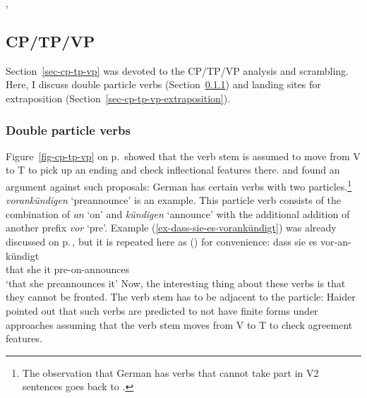 \citet*{GKPS85a}, \citet{Sag2020a}

\fi

\subsection{CP/TP/VP}
\label{sec-cp-tp-vp-and-verb-last-non-movement}

Section~\ref{sec-cp-tp-vp} was devoted to the CP/TP/VP analysis and
scrambling. Here, I discuss double particle verbs (Section~\ref{sec-cp-tp-vp-double-particles}) and landing sites for extraposition (Section~\ref{sec-cp-tp-vp-extraposition}).

\subsubsection{Double particle verbs}
\label{sec-cp-tp-vp-double-particles}


Figure~\ref{fig-cp-tp-vp} on p.\,\pageref{fig-cp-tp-vp} showed that the verb stem is assumed to move from V to T to
pick up an ending and check inflectional features there. \textcites[]{Haider93a}[--60]{Haider2010a} and \citet[Section~3.3]{Vikner2001a} found an
argument against such proposals: German has certain verbs with two particles.\footnote{%
  The observation that German has verbs that cannot take part in V2 sentences goes back to
  \citet{Hoehle91b}.
} 
\emph{vorankündigen} `preannounce'
is an example. This particle verb consists of the combination of \emph{an} `on' and \emph{kündigen} `announce' with
the additional addition of another prefix \emph{vor} `pre'. Example
(\ref{ex-dass-sie-es-vorankündigt}) was already discussed on
p.\,\pageref{ex-dass-sie-es-vorankündigt}, but it is repeated here as () for convenience:
\ea 
\label{ex-dass-sie-es-vorankündigt-two}
\gll dass sie es vor-an-kündigt\\
     that she it pre-on-announces\\
\glt `that she preannounces it'
\z
Now, the interesting thing about these verbs is that they cannot be fronted. The verb stem has to be
adjacent to the particle:
\eal
{}
\zl
Haider pointed out that such verbs are predicted to not have finite forms under approaches assuming
that the verb stem moves from V to T to check agreement features.

